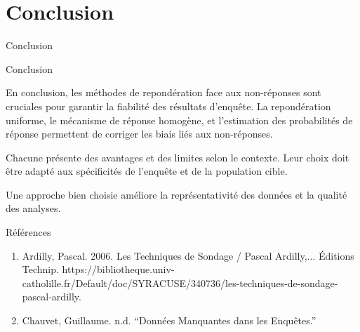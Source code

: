 \section{Conclusion} %

\begin{frame}{}
	
	\huge \begin{center}
		Conclusion
	\end{center}
	
\end{frame}

\begin{frame}{Conclusion}
  
  En conclusion, les méthodes de repondération face aux non-réponses sont cruciales pour garantir la fiabilité des résultats d'enquête. La repondération uniforme, le mécanisme de réponse homogène, et l'estimation des probabilités de réponse permettent de corriger les biais liés aux non-réponses.\\ \vspace{0.4cm}
  
   Chacune présente des avantages et des limites selon le contexte. Leur choix doit être adapté aux spécificités de l’enquête et de la population cible. \\ \vspace{0.4cm}
  
  Une approche bien choisie améliore la représentativité des données et la qualité des analyses.
\end{frame}



\begin{frame}{Références}
	\begin{enumerate}
\item Ardilly, Pascal. 2006. Les Techniques de Sondage / Pascal Ardilly,... Éditions Technip. https://bibliotheque.univ-catholille.fr/Default/doc/SYRACUSE/340736/les-techniques-de-sondage-pascal-ardilly.\\ \vspace{0.5cm}
\item Chauvet, Guillaume. n.d. “Données Manquantes dans les Enquêtes.”
	\end{enumerate}


\end{frame}